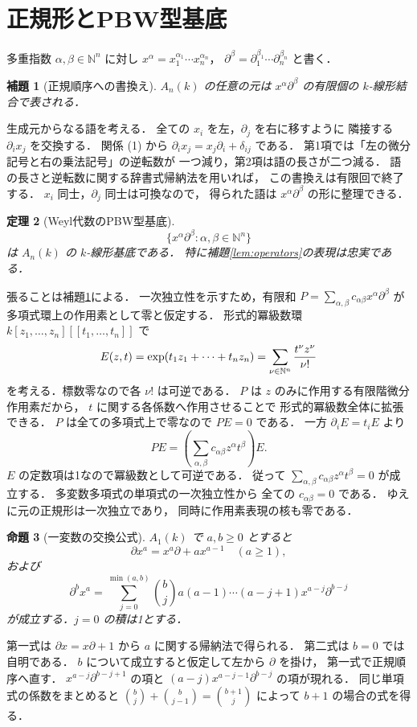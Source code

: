 \documentclass[a5paper,10pt,onecolumn]{jsarticle}
\makeatletter
\theoremstyle{mathnotetheorem}
\newtheorem{theorem}{定理}[section]
\newtheorem{lemma}[theorem]{補題}
\newtheorem{proposition}[theorem]{命題}
\renewcommand{\proofname}{証明}
\renewenvironment{proof}[1][\proofname]{%
  \par\pushQED{\qed}\normalfont\topsep4\p@\@plus2\p@\relax
  \trivlist\item[\hskip\labelsep\bfseries #1]\ignorespaces
}{\popQED\endtrivlist\@endpefalse}
\makeatother
\begin{document}
\section{正規形とPBW型基底}
多重指数 $\alpha,\beta\in\mathbb N^n$ に対し
$x^\alpha=x_1^{\alpha_1}\cdots x_n^{\alpha_n}$，
$\partial^\beta=\partial_1^{\beta_1}\cdots\partial_n^{\beta_n}$
と書く．
\begin{lemma}[正規順序への書換え]\label{lem:normal}
$A_n(k)$ の任意の元は
$x^\alpha\partial^\beta$ の有限個の $k$-線形結合で表される．
\end{lemma}
\begin{proof}
生成元からなる語を考える．
全ての $x_i$ を左，$\partial_j$ を右に移すように
隣接する $\partial_i x_j$ を交換する．
関係 (1) から
$\partial_i x_j=x_j\partial_i+\delta_{ij}$ である．
第1項では「左の微分記号と右の乗法記号」の逆転数が
一つ減り，第2項は語の長さが二つ減る．
語の長さと逆転数に関する辞書式帰納法を用いれば，
この書換えは有限回で終了する．
$x_i$ 同士，$\partial_j$ 同士は可換なので，
得られた語は $x^\alpha\partial^\beta$ の形に整理できる．
\end{proof}
\begin{theorem}[Weyl代数のPBW型基底]\label{thm:pbw}
\[
 \{x^\alpha\partial^\beta:
   \alpha,\beta\in\mathbb N^n\}
\]
は $A_n(k)$ の $k$-線形基底である．
特に補題\ref{lem:operators}の表現は忠実である．
\end{theorem}

\begin{proof}
張ることは補題\ref{lem:normal}による．
一次独立性を示すため，有限和
$P=\sum_{\alpha,\beta}
 c_{\alpha\beta}x^\alpha\partial^\beta$ が
多項式環上の作用素として零と仮定する．
形式的冪級数環
$k[z_1,\ldots,z_n][[t_1,\ldots,t_n]]$ で
\[
 E(z,t)=\exp(t_1z_1+\cdots+t_nz_n)
 =\sum_{\nu\in\mathbb N^n}{t^\nu z^\nu\over\nu!}
\]
を考える．標数零なので各 $\nu!$ は可逆である．
$P$ は $z$ のみに作用する有限階微分作用素だから，
$t$ に関する各係数へ作用させることで
形式的冪級数全体に拡張できる．
$P$ は全ての多項式上で零なので $PE=0$ である．
一方 $\partial_iE=t_iE$ より
\[
 PE=\left(\sum_{\alpha,\beta}
 c_{\alpha\beta}z^\alpha t^\beta\right)E.
\]
$E$ の定数項は1なので冪級数として可逆である．
従って $\sum_{\alpha,\beta}c_{\alpha\beta}
z^\alpha t^\beta=0$ が成立する．
多変数多項式の単項式の一次独立性から
全ての $c_{\alpha\beta}=0$ である．
ゆえに元の正規形は一次独立であり，
同時に作用素表現の核も零である．
\end{proof}
\begin{proposition}[一変数の交換公式]
$A_1(k)$ で $a,b\ge0$ とすると
\[
 \partial x^a=x^a\partial+a x^{a-1}
 \quad(a\ge1),
\]
および
\[
 \partial^b x^a
 =\sum_{j=0}^{\min(a,b)}
 {b\choose j}a(a-1)\cdots(a-j+1)
 x^{a-j}\partial^{b-j}
 \tag{2}
\]
が成立する．$j=0$ の積は1とする．
\end{proposition}
\begin{proof}
第一式は $\partial x=x\partial+1$ から
$a$ に関する帰納法で得られる．
第二式は $b=0$ では自明である．
$b$ について成立すると仮定して左から $\partial$ を掛け，
第一式で正規順序へ直す．
$x^{a-j}\partial^{b-j+1}$ の項と
$(a-j)x^{a-j-1}\partial^{b-j}$ の項が現れる．
同じ単項式の係数をまとめると
$ {b\choose j}+{b\choose j-1}={b+1\choose j}$
によって $b+1$ の場合の式を得る．
\end{proof}
\end{document}
